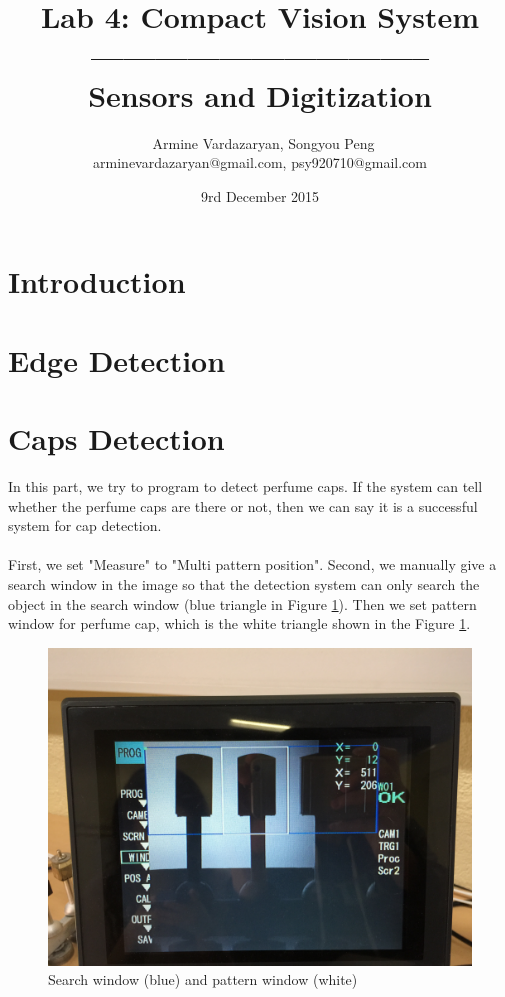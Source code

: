 \documentclass[english]{article}
\begin{document}
\title{Lab 4: Compact Vision System\\ -------------------------------- \\ \Large Sensors and Digitization}
\author{ \ Armine Vardazaryan, Songyou Peng \\ arminevardazaryan@gmail.com, psy920710@gmail.com}
\date{9rd December 2015}

\maketitle

\section{Introduction}

\section{Edge Detection}
\section{Caps Detection}
In this part, we try to program to detect perfume caps.
If the system can tell whether the perfume caps are there or not, then we can say it is a successful system for cap detection.\\
\\
First, we set "Measure" to "Multi pattern position".
Second, we manually give a search window in the image so that the detection system can only search the object in the search window (blue triangle in Figure \ref{fig:window}).
Then we set pattern window for perfume cap, which is the white triangle shown in the Figure \ref{fig:window}.

\begin{figure}[H]
	\centering
	\includegraphics[width=0.45\linewidth]{Pictures/IMG_1225.JPG}
	\caption{Search window (blue) and pattern window (white)}
	\label{fig:window}
\end{figure} 
\end{document}
